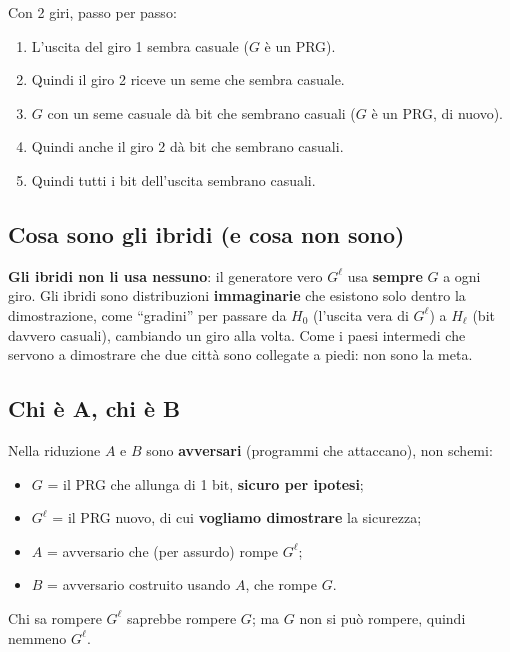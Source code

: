 Con 2 giri, passo per passo:
\begin{enumerate}
  \item L'uscita del giro 1 sembra casuale (\(G\) è un PRG).
  \item Quindi il giro 2 riceve un seme che sembra casuale.
  \item \(G\) con un seme casuale dà bit che sembrano casuali (\(G\) è un PRG, di nuovo).
  \item Quindi anche il giro 2 dà bit che sembrano casuali.
  \item Quindi tutti i bit dell'uscita sembrano casuali.
\end{enumerate}

\subsection{Cosa sono gli ibridi (e cosa non sono)}

\begin{nota}
\textbf{Gli ibridi non li usa nessuno}: il generatore vero \(G^\ell\) usa \textbf{sempre} \(G\) a ogni giro. Gli ibridi sono distribuzioni \textbf{immaginarie} che esistono solo dentro la dimostrazione, come ``gradini'' per passare da \(H_0\) (l'uscita vera di \(G^\ell\)) a \(H_\ell\) (bit davvero casuali), cambiando un giro alla volta. Come i paesi intermedi che servono a dimostrare che due città sono collegate a piedi: non sono la meta.
\end{nota}

\subsection{Chi è A, chi è B}

\begin{nota}
Nella riduzione \(A\) e \(B\) sono \textbf{avversari} (programmi che attaccano), non schemi:
\begin{itemize}
  \item \(G\) = il PRG che allunga di 1 bit, \textbf{sicuro per ipotesi};
  \item \(G^\ell\) = il PRG nuovo, di cui \textbf{vogliamo dimostrare} la sicurezza;
  \item \(A\) = avversario che (per assurdo) rompe \(G^\ell\);
  \item \(B\) = avversario costruito usando \(A\), che rompe \(G\).
\end{itemize}
Chi sa rompere \(G^\ell\) saprebbe rompere \(G\); ma \(G\) non si può rompere, quindi nemmeno \(G^\ell\).
\end{nota}

